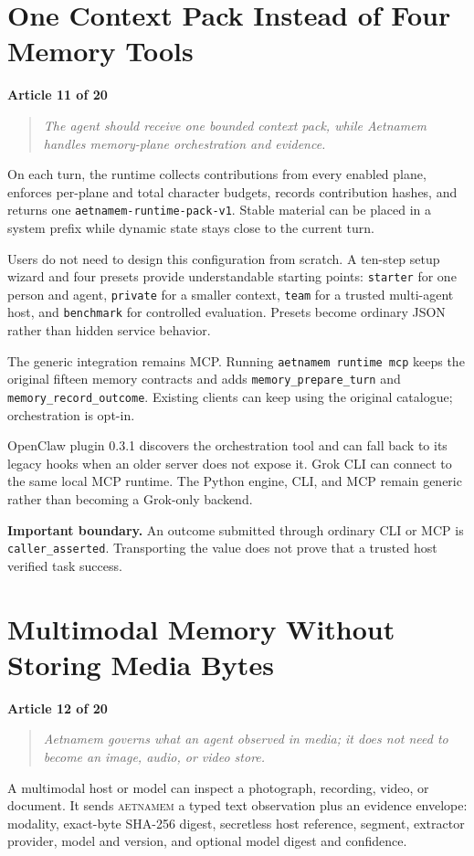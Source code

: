 \documentclass[11pt]{article}
\newcommand{\system}{\textsc{aetnamem}}
\newcommand{\articlelabel}[1]{%
  \noindent\colorbox{aetnaTeal!10}{%
    \parbox{0.96\textwidth}{\color{aetnaInk}\small\textbf{Article #1 of 20}}}%
  \par\medskip}
\newcommand{\coreidea}[1]{%
  \begin{quote}\color{aetnaTeal}\large\itshape #1\end{quote}}
\newcommand{\boundary}[1]{%
  \par\smallskip\noindent\textbf{Important boundary.} #1}
\begin{document}
\section{One Context Pack Instead of Four Memory Tools}
\articlelabel{11}
\coreidea{The agent should receive one bounded context pack, while Aetnamem
handles memory-plane orchestration and evidence.}

On each turn, the runtime collects contributions from every enabled plane,
enforces per-plane and total character budgets, records contribution hashes,
and returns one \texttt{aetnamem-runtime-pack-v1}. Stable material can be
placed in a system prefix while dynamic state stays close to the current turn.

Users do not need to design this configuration from scratch. A ten-step setup
wizard and four presets provide understandable starting points:
\texttt{starter} for one person and agent, \texttt{private} for a smaller
context, \texttt{team} for a trusted multi-agent host, and \texttt{benchmark}
for controlled evaluation. Presets become ordinary JSON rather than hidden
service behavior.

The generic integration remains MCP. Running \texttt{aetnamem runtime mcp}
keeps the original fifteen memory contracts and adds
\texttt{memory\_prepare\_turn} and \texttt{memory\_record\_outcome}. Existing
clients can keep using the original catalogue; orchestration is opt-in.

OpenClaw plugin 0.3.1 discovers the orchestration tool and can fall back to its
legacy hooks when an older server does not expose it. Grok CLI can connect to
the same local MCP runtime. The Python engine, CLI, and MCP remain generic
rather than becoming a Grok-only backend.

\boundary{An outcome submitted through ordinary CLI or MCP is
\texttt{caller\_asserted}. Transporting the value does not prove that a trusted
host verified task success.}

\clearpage
\section{Multimodal Memory Without Storing Media Bytes}
\articlelabel{12}
\coreidea{Aetnamem governs what an agent observed in media; it does not need
to become an image, audio, or video store.}

A multimodal host or model can inspect a photograph, recording, video, or
document. It sends \system{} a typed text observation plus an evidence
envelope: modality, exact-byte SHA-256 digest, secretless host reference,
segment, extractor provider, model and version, and optional model digest and
confidence.
\end{document}
